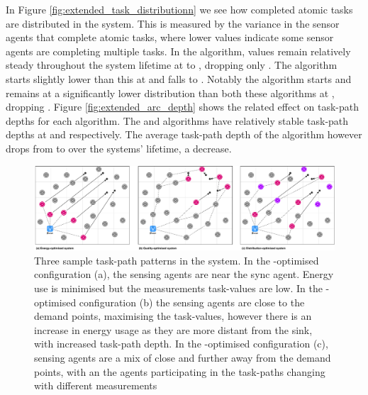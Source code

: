 In Figure \ref{fig:extended_task_distributionn} we see how completed atomic tasks are distributed in the system. This is measured by the variance in the sensor agents that complete atomic tasks, where lower values indicate some sensor agents are completing multiple tasks. In the \algorithmDistribution{}{} algorithm, values remain relatively steady throughout the system lifetime at \resultsTaskDistDistStart{}{} to \resultsTaskDistDistEnd{}{}, dropping only \resultsTaskDistDistPercent{}{}. The \algorithmQuality{}{} algorithm starts slightly lower than this at \resultsTaskDistQualityStart{}{} and falls \resultsTaskDistQualityPercent{}{} to \resultsTaskDistQualityEnd{}{}. Notably the \algorithmEnergy{}{} algorithm starts and remains at a significantly lower distribution than both these algorithms at \resultsTaskDistEnergyEnd{}{}, dropping \resultsTaskDistEnergydPercent{}{}. Figure
\ref{fig:extended_arc_depth} shows the related effect on task-path depths for each algorithm. The \algorithmQuality{}{} and \algorithmDistribution{}{} algorithms have relatively stable task-path depths at \resultsArcDepthQualityEnd{}{} and \resultsArcDepthDistEnd{}{} respectively. The average task-path depth of the \algorithmEnergy{}{} algorithm however drops from \resultsArcDepthEnergyStart{}{} to  \resultsArcDepthEnergyEnd{}{} over the systems' lifetime, a \resultsArcDepthEnergyPercent{}{} decrease.

\begin{figure}
	\centering
	\includegraphics[width=1.0\linewidth]{result-types}
	\caption{Three sample task-path patterns in the \simulationExtended{}{} system. In the \algorithmEnergy{}{}-optimised configuration (a), the sensing agents are near the sync agent. Energy use is minimised but the measurements task-values are low. In the \algorithmQuality{}{}-optimised configuration (b) the sensing agents are close to the demand points, maximising the task-values, however there is an increase in energy usage as they are more distant from the sink, with increased task-path depth. In the \algorithmDistribution{}{}-optimised configuration (c), sensing agents are a mix of close and further away from the demand points, with an the agents participating in the task-paths changing with different measurements}
	\label{fig:result-types}
\end{figure} 

